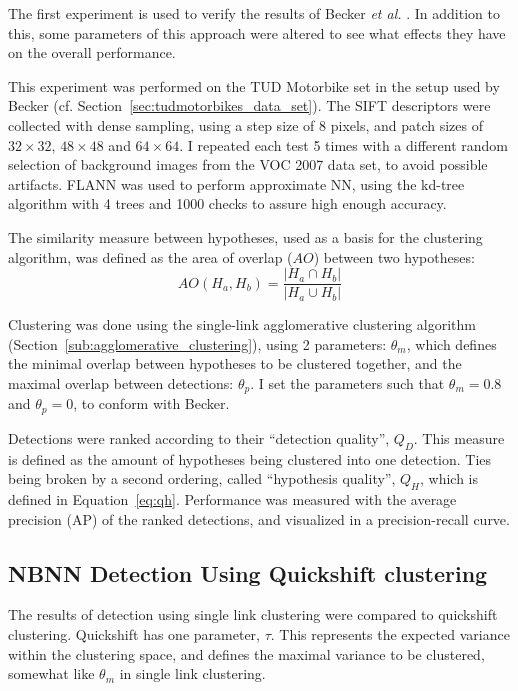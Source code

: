 The first experiment is used to verify the results of Becker \emph{et al.} \cite{becker2012codebook}. In addition to this, some parameters of this approach were altered to see what effects they have on the overall performance.

This experiment was performed on the TUD Motorbike set in the setup used by Becker (cf. Section~\ref{sec:tudmotorbikes_data_set}). The SIFT descriptors were collected with dense sampling, using a step size of 8 pixels, and patch sizes of $32\times32$, $48\times48$ and $64\times64$. I repeated each test 5 times with a different random selection of background images from the VOC 2007 data set, to avoid possible artifacts. FLANN was used to perform approximate NN, using the kd-tree algorithm with 4 trees and 1000 checks to assure high enough accuracy.

The similarity measure between hypotheses, used as a basis for the clustering algorithm, was defined as the area of overlap ($AO$) between two hypotheses:
\begin{equation}
    AO(H_a, H_b)= \frac{|H_a\cap H_b|}{|H_a\cup H_b|}
\end{equation}

Clustering was done using the single-link agglomerative clustering algorithm (Section~\ref{sub:agglomerative_clustering}), using 2 parameters: $\theta_m$, which defines the minimal overlap between hypotheses to be clustered together, and the maximal overlap between detections: $\theta_p$. I set the parameters such that $\theta_m = 0.8$ and $\theta_p = 0$, to conform with Becker.

Detections were ranked according to their ``detection quality'', $Q_D$. This measure is defined as the amount of hypotheses being clustered into one detection. Ties being broken by a second ordering, called ``hypothesis quality'', $Q_H$, which is defined in Equation~\eqref{eq:qh}. Performance was measured with the average precision (AP) of the ranked detections, and visualized in a precision-recall curve.

\subsection{NBNN Detection Using Quickshift clustering} %
\label{sub:nbnn_detection_using_quickshift_clustering}

The results of detection using single link clustering were compared to quickshift clustering. Quickshift has one parameter, $\tau$. This represents the expected variance within the clustering space, and defines the maximal variance to be clustered, somewhat like $\theta_m$ in single link clustering.

